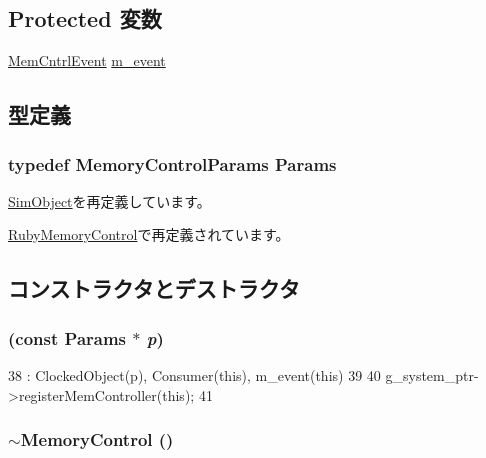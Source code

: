 \subsection*{Protected 変数}
\begin{DoxyCompactItemize}
\item 
\hyperlink{classMemoryControl_1_1MemCntrlEvent}{MemCntrlEvent} \hyperlink{classMemoryControl_abbf06cc9d10fae424e60034190a2b38f}{m\_\-event}
\end{DoxyCompactItemize}


\subsection{型定義}
\hypertarget{classMemoryControl_aec6d67eaecba2a2311edc4c4c78fb0f5}{
\subsubsection[{Params}]{\setlength{\rightskip}{0pt plus 5cm}typedef MemoryControlParams {\bf Params}}}
\label{classMemoryControl_aec6d67eaecba2a2311edc4c4c78fb0f5}


\hyperlink{classSimObject_a0f0761d2db586a23bb2a2880b8f387bb}{SimObject}を再定義しています。

\hyperlink{classRubyMemoryControl_af43d4e91847a2856227bcb75a70a9a86}{RubyMemoryControl}で再定義されています。

\subsection{コンストラクタとデストラクタ}
\hypertarget{classMemoryControl_a189a6ca42c937f0d9645cd5ea91be48f}{
\subsubsection[{MemoryControl}]{ (const {\bf Params} $\ast$ {\em p})}}
\label{classMemoryControl_a189a6ca42c937f0d9645cd5ea91be48f}



\begin{DoxyCode}
38     : ClockedObject(p), Consumer(this), m_event(this)
39 {
40     g_system_ptr->registerMemController(this);
41 }
\end{DoxyCode}
\hypertarget{classMemoryControl_a2e5f16844fdb309595860b4a79f17b67}{
\subsubsection[{$\sim$MemoryControl}]{\setlength{\rightskip}{0pt plus 5cm}$\sim${\bf MemoryControl} ()}}
\label{classMemoryControl_a2e5f16844fdb309595860b4a79f17b67}



